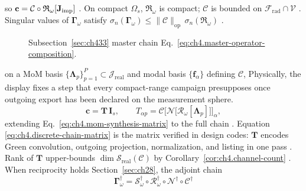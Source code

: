 so \(\mathbf{c}=\mathcal{C}\circ\mathfrak{R}_\omega[\mathbf{J}_{\mathrm{imp}}]\) \cite{stratton1941}. On compact
\(\Omega_{s}\), \(\mathfrak{R}_\omega\) is compact; \(\mathcal{C}\) is bounded on
\(\mathcal{F}_{\mathrm{rad}}\cap\mathcal{V}\) \cite{harrington2001}. Singular values of
\(\boldsymbol{\Gamma}_\omega\) satisfy \(\sigma_{n}(\boldsymbol{\Gamma}_\omega)\le
\|\mathcal{C}\|_{\mathrm{op}}\,\sigma_{n}(\mathfrak{R}_\omega)\) \cite{stratton1941}.
\begin{figure}[t]
\centering
{}
\caption{Subsection~\ref{sec:ch433} master chain Eq.~\eqref{eq:ch4.master-operator-composition}.}
\label{fig:ch4.master-operator-composition}
\end{figure}
on a MoM basis \(\{\boldsymbol{\Lambda}_{p}\}_{p=1}^{P}\subset\mathcal{J}_{\mathrm{real}}\) and modal basis
\(\{\mathbf{f}_\alpha\}\) defining \(\mathcal{C}\),
Physically, the display fixes a step that every compact-range campaign presupposes once outgoing export has been declared on the measurement sphere. \cite{stratton1941}
\begin{equation}
\label{eq:ch4.discrete-chain-matrix}
\mathbf{c}
=
\mathbf{T}\,\mathbf{I}_{s},
\qquad
T_{\alpha p}
=
\mathcal{C}\Big[\mathcal{N}\big[\mathcal{R}_\omega[\boldsymbol{\Lambda}_{p}]\big]\Big]_{\alpha},
\end{equation}
extending Eq.~\eqref{eq:ch4.mom-synthesis-matrix} to the full chain \cite{harrington2001}. Equation
\eqref{eq:ch4.discrete-chain-matrix} is the matrix verified in design codes: \(\mathbf{T}\) encodes Green
convolution, outgoing projection, normalization, and listing in one pass \cite{harrington2001}. Rank of
\(\mathbf{T}\) upper-bounds \(\dim\mathcal{S}_{\mathrm{real}}(\mathcal{C})\) by Corollary~\ref{cor:ch4.channel-count}
\cite{devaney2004}.
When reciprocity holds Section~\ref{sec:ch28}, the adjoint chain
\begin{equation}
\label{eq:ch4.adjoint-chain}
\boldsymbol{\Gamma}_\omega^{\dagger}
=
\mathcal{S}_\omega^{\dagger}\circ\mathcal{R}_\omega^{\dagger}\circ\mathcal{N}^{\dagger}\circ\mathcal{C}^{\dagger}
\end{equation}
